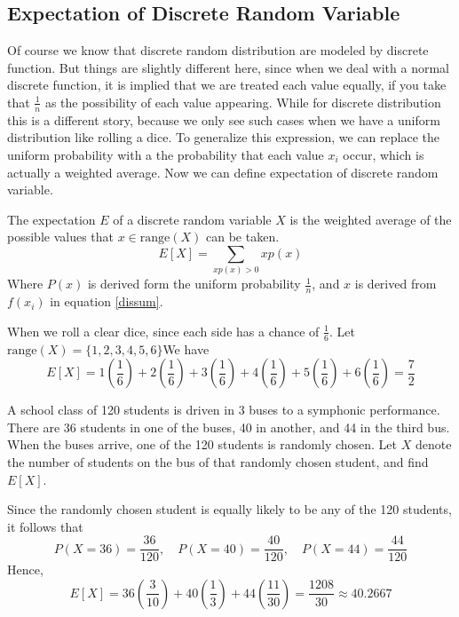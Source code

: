 \subsection{Expectation of Discrete Random Variable}
Of course we know that discrete random distribution are modeled by discrete function. But things are slightly different here, since when we deal with a normal discrete function, it is implied that we are treated each value equally, if you take that $\frac{1}{n}$ as the possibility of each value appearing. While for discrete distribution this is a different story, because we only see such cases when we have a uniform distribution like rolling a dice. To generalize this expression, we can replace the uniform probability with a the probability that each value $x_i$ occur, which is actually a weighted average. Now we can define expectation of discrete random variable.
\begin{definition}
The expectation $E$ of a discrete random variable $X$ is the weighted average of the possible values that $x\in \text{range}(X)$ can be taken.
\begin{equation}
E[X] = \sum_{xp(x) > 0} xp(x)
\end{equation}
Where $P(x)$ is derived form the uniform probability $\frac{1}{n}$, and $x$ is derived from $f(x_i)$ in equation \ref*{dissum}.
\end{definition}

\begin{example}
    When we roll a clear dice, since each side has a chance of $\frac{1}{6}$.
    Let $\text{range}(X) = \{1,2,3,4,5,6\}$We have 
    \[
    E[X] = 1\left(\frac16\right)+2\left(\frac16\right)+3\left(\frac16\right)+4\left(\frac16\right)+5\left(\frac16\right)+6\left(\frac16\right)=\frac72
    \]
\end{example}

\begin{example}
    A school class of 120 students is driven in 3 buses to a symphonic performance. There are 36 students in one of the buses, 40 in another, and 44 in the third bus. When the buses arrive, one of the 120 students is randomly chosen. Let $X$ denote the number of students on the bus of that randomly chosen student, and find $E[X]$.
    \begin{solution}
        Since the randomly chosen student is equally likely to be any of the 120 students, it follows that
\[
P(X = 36) = \frac{36}{120}, \quad P(X = 40) = \frac{40}{120}, \quad P(X = 44) = \frac{44}{120}
\]
Hence,
\[
E[X] = 36 \left(\frac{3}{10}\right) + 40 \left(\frac{1}{3}\right) + 44 \left(\frac{11}{30}\right) = \frac{1208}{30} \approx 40.2667
\]
    \end{solution}
\end{example}

